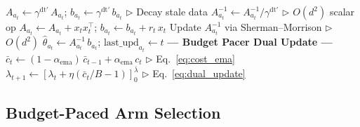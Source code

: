 \begin{algorithm}[ht]
\begin{algorithmic}[1]
\STATE $A_{a_t} \leftarrow \gamma^{\mathrm{dt}'}\, A_{a_t}$;\; $b_{a_t} \leftarrow \gamma^{\mathrm{dt}'}\, b_{a_t}$ \label{line:forget} \hfill $\triangleright$ Decay stale data
\STATE $A_{a_t}^{-1} \leftarrow A_{a_t}^{-1} / \gamma^{\mathrm{dt}'}$ \hfill $\triangleright$ $O(d^2)$ scalar op
\STATE $A_{a_t} \leftarrow A_{a_t} + x_t x_t^\top$;\; $b_{a_t} \leftarrow b_{a_t} + r_t\, x_t$
\STATE Update $A_{a_t}^{-1}$ via Sherman--Morrison \hfill $\triangleright$ $O(d^2)$
\STATE $\hat\theta_{a_t} \leftarrow A_{a_t}^{-1}\, b_{a_t}$;\; $\text{last\_upd}_{a_t} \leftarrow t$
\STATE \textbf{--- Budget Pacer Dual Update ---}
\STATE $\bar{c}_t \leftarrow (1 {-} \alpha_{\mathrm{ema}})\,\bar{c}_{t-1} + \alpha_{\mathrm{ema}}\,c_t$ \hfill $\triangleright$ Eq.~\ref{eq:cost_ema}
\STATE $\lambda_{t+1} \leftarrow [\lambda_t + \eta(\bar{c}_t / B - 1)]_{0}^{\bar\lambda}$ \label{line:dual} \hfill $\triangleright$ Eq.~\ref{eq:dual_update}
\ENDFOR
\end{algorithmic}
\end{algorithm}

\subsection{Budget-Paced Arm Selection}
\label{sec:budget_pacer}

